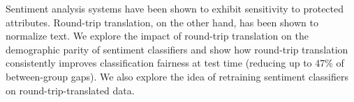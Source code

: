 Sentiment analysis systems have been shown to exhibit sensitivity to protected attributes. Round-trip translation, on the other hand, has been shown to normalize text. We explore the impact of round-trip translation on the demographic parity of sentiment classifiers and show how round-trip translation consistently improves classification fairness at test time (reducing up to 47\% of between-group gaps). We also explore the idea of retraining sentiment classifiers on round-trip-translated data.
